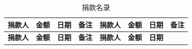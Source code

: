 \documentclass[doctor,openright,twoside]{sjtuthesis}
\theoremstyle{plain}
\theoremstyle{definition}
\theoremstyle{remark}
\theoremstyle{ocrenumbox}
\theoremstyle{plain}
\begin{document}
\begin{longtable}[]{@{}cccccccc@{}}
\caption{捐款名录}\tabularnewline
\toprule
\begin{minipage}[b]{0.11\columnwidth}\centering
\textbf{捐款人}\strut
\end{minipage} & \begin{minipage}[b]{0.09\columnwidth}\centering
\textbf{金额}\strut
\end{minipage} & \begin{minipage}[b]{0.09\columnwidth}\centering
\textbf{日期}\strut
\end{minipage} & \begin{minipage}[b]{0.09\columnwidth}\centering
\textbf{备注}\strut
\end{minipage} & \begin{minipage}[b]{0.11\columnwidth}\centering
\textbf{捐款人}\strut
\end{minipage} & \begin{minipage}[b]{0.09\columnwidth}\centering
\textbf{金额}\strut
\end{minipage} & \begin{minipage}[b]{0.09\columnwidth}\centering
\textbf{日期}\strut
\end{minipage} & \begin{minipage}[b]{0.10\columnwidth}\centering
\textbf{备注}\strut
\end{minipage}\tabularnewline
\midrule
\endfirsthead
\toprule
\begin{minipage}[b]{0.11\columnwidth}\centering
\textbf{捐款人}\strut
\end{minipage} & \begin{minipage}[b]{0.09\columnwidth}\centering
\textbf{金额}\strut
\end{minipage} & \begin{minipage}[b]{0.09\columnwidth}\centering
\textbf{日期}\strut
\end{minipage} & \begin{minipage}[b]{0.09\columnwidth}\centering
\textbf{备注}\strut
\end{minipage} & \begin{minipage}[b]{0.11\columnwidth}\centering
\textbf{捐款人}\strut
\end{minipage} & \begin{minipage}[b]{0.09\columnwidth}\centering
\textbf{金额}\strut
\end{minipage} & \begin{minipage}[b]{0.09\columnwidth}\centering
\textbf{日期}\strut
\end{minipage} & \begin{minipage}[b]{0.10\columnwidth}\centering

\end{minipage}
\end{longtable}
\end{document}
